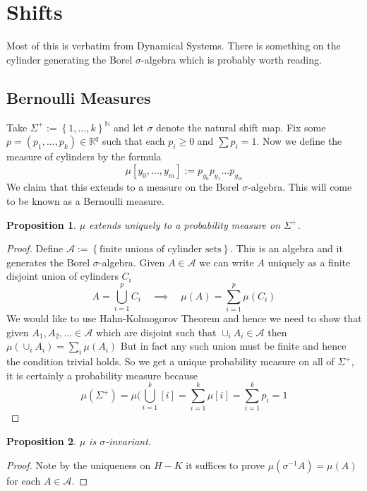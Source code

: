 \documentclass[11pt]{article}
\newcommand{\defeq}{:=}
\newcommand{\R}{\mathbb{R}}
\newcommand{\N}{\mathbb{N}}
\newcommand{\mdf}[1]{{\color{red} #1}}
\newtheorem{prop}{Proposition}[section]
\begin{document}
\section{Shifts}
Most of this is verbatim from Dynamical Systems.
There is something on the cylinder generating the Borel $\sigma$-algebra which is probably worth reading.

\subsection{Bernoulli Measures}
Take $\Sigma^+ \defeq \left\{ 1, \dots, k\right\}^\N$ and let $\sigma$ denote the natural shift map.
Fix some $p=(p_1, \dots, p_k)\in \R^q$ such that each $p_i\geq 0$ and $\sum p_i=1$.
Now we define the measure of cylinders by the formula 
\[
	\mu[y_0, \dots, y_m] \defeq p_{y_0}p_{y_1}\dots p_{y_m}
\]
We claim that this extends to a measure on the Borel $\sigma$-algebra.
This will come to be known as a \mdf{Bernoulli measure}.

\begin{prop}
$\mu$ extends uniquely to a probability measure on $\Sigma^+$.
\end{prop}

\begin{proof}
Define $\mathcal{A}\defeq\left\{ \text{finite unions of cylinder sets}\right\}$.
This is an algebra and it generates the Borel $\sigma$-algebra.
Given $A\in\mathcal{A}$ we can write $A$ uniquely as a finite disjoint union of cylinders $C_i$
\[
	A = \bigcup_{i=1}^p C_i \quad \implies \quad \mu(A) = \sum_{i=1}^p \mu(C_i)
\]
We would like to use Hahn-Kolmogorov Theorem and hence we need to show that given $A_1, A_2, \dots \in \mathcal{A}$ which are disjoint such that $\cup_i A_i\in\mathcal{A}$ then $\mu(\cup_i A_i) = \sum_{i}\mu(A_i)$
But in fact any such union must be finite and hence the condition trivial holds.
So we get a unique probability measure on all of $\Sigma^+$, it is certainly a probability measure because
\[
	\mu(\Sigma^+) = \mu(\bigcup_{i=1}^k \left[ i\right] = \sum_{i=1}^k \mu\left[ i\right] =\sum_{i=1}^k p_i = 1
\]
\end{proof}

\begin{prop}
$\mu$ is $\sigma$-invariant.
\end{prop}

\begin{proof}
Note by the uniqueness on $H-K$ it suffices to prove $\mu(\sigma^{-1}A) = \mu(A)$ for each $A\in\mathcal{A}$.
\end{proof}
\end{document}
